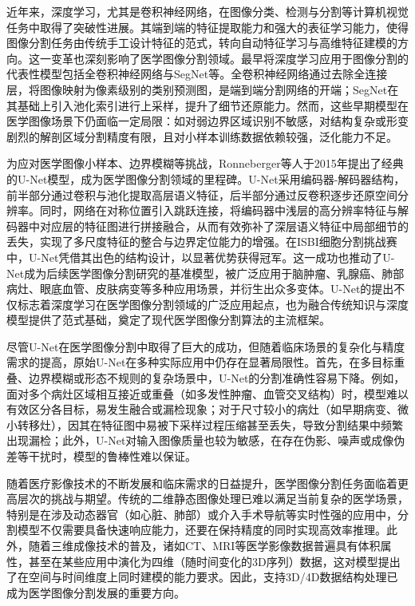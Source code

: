 近年来，深度学习，尤其是卷积神经网络，在图像分类、检测与分割等计算机视觉任务中取得了突破性进展。其端到端的特征提取能力和强大的表征学习能力，使得图像分割任务由传统手工设计特征的范式，转向自动特征学习与高维特征建模的方向。这一变革也深刻影响了医学图像分割领域。最早将深度学习应用于图像分割的代表性模型包括全卷积神经网络与SegNet等。全卷积神经网络通过去除全连接层，将图像映射为像素级别的类别预测图，是端到端分割网络的开端\cite{shelhamer2016}；SegNet在其基础上引入池化索引进行上采样，提升了细节还原能力。然而，这些早期模型在医学图像场景下仍面临一定局限：如对弱边界区域识别不敏感，对结构复杂或形变剧烈的解剖区域分割精度有限，且对小样本训练数据依赖较强，泛化能力不足。

为应对医学图像小样本、边界模糊等挑战，Ronneberger等人\cite{ronneberger2015}于2015年提出了经典的U-Net模型，成为医学图像分割领域的里程碑。U-Net采用编码器-解码器结构，前半部分通过卷积与池化提取高层语义特征，后半部分通过反卷积逐步还原空间分辨率。同时，网络在对称位置引入跳跃连接，将编码器中浅层的高分辨率特征与解码器中对应层的特征图进行拼接融合，从而有效弥补了深层语义特征中局部细节的丢失，实现了多尺度特征的整合与边界定位能力的增强。在ISBI细胞分割挑战赛中，U-Net凭借其出色的结构设计，以显著优势获得冠军。这一成功也推动了U-Net成为后续医学图像分割研究的基准模型，被广泛应用于脑肿瘤、乳腺癌、肺部病灶、眼底血管、皮肤病变等多种应用场景，并衍生出众多变体。U-Net的提出不仅标志着深度学习在医学图像分割领域的广泛应用起点，也为融合传统知识与深度模型提供了范式基础，奠定了现代医学图像分割算法的主流框架。


尽管U-Net在医学图像分割中取得了巨大的成功，但随着临床场景的复杂化与精度需求的提高，原始U-Net在多种实际应用中仍存在显著局限性。首先，在多目标重叠、边界模糊或形态不规则的复杂场景中，U-Net的分割准确性容易下降。例如，面对多个病灶区域相互接近或重叠（如多发性肿瘤、血管交叉结构）时，模型难以有效区分各目标，易发生融合或漏检现象；对于尺寸较小的病灶（如早期病变、微小转移灶），因其在特征图中易被下采样过程压缩甚至丢失，导致分割结果中频繁出现漏检；此外，U-Net对输入图像质量也较为敏感，在存在伪影、噪声或成像伪差等干扰时，模型的鲁棒性难以保证\cite{azad2024}。

随着医疗影像技术的不断发展和临床需求的日益提升，医学图像分割任务面临着更高层次的挑战与期望。传统的二维静态图像处理已难以满足当前复杂的医学场景，特别是在涉及动态器官（如心脏、肺部）或介入手术导航等实时性强的应用中，分割模型不仅需要具备快速响应能力，还要在保持精度的同时实现高效率推理。此外，随着三维成像技术的普及，诸如CT、MRI等医学影像数据普遍具有体积属性，甚至在某些应用中演化为四维（随时间变化的3D序列）数据，这对模型提出了在空间与时间维度上同时建模的能力要求。因此，支持3D/4D数据结构处理已成为医学图像分割发展的重要方向。

